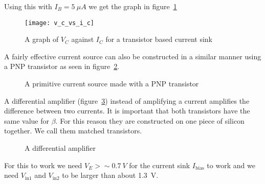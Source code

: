 \documentclass{article}
\begin{document}
    Using this with \(I_B = \SI{5}{\mu A}\) we get the graph in figure~\ref{fig:sink V_C-I_C}
    
    \begin{figure}[ht]
        \centering
        \texttt{[image: v\_c\_vs\_i\_c]}
        \caption{A graph of \(V_C\) against \(I_C\) for a transistor based current sink}
        \label{fig:sink V_C-I_C}
    \end{figure}
    
    A fairly effective current source can also be constructed in a similar manner using a PNP transistor as seen in figure~\ref{fig:primitive current source}.
    
    \begin{figure}[ht]
        \centering
        \caption{A primitive current source made with a PNP transistor}
        \label{fig:primitive current source}
    \end{figure}
    
    A differential amplifier (figure~\ref{fig:differential amplifier}) instead of amplifying a current amplifies the difference between two currents. It is important that both transistors have the same value for \(\beta\). For this reason they are constructed on one piece of silicon together. We call them matched transistors.
    
    \begin{figure}[ht]
        \centering
        \caption{A differential amplifier}
        \label{fig:differential amplifier}
    \end{figure}
    For this to work we need \(V_E>\sim \SI{0.7}{V}\) for the current sink \(I_\text{bias}\) to work and we need \(V_\text{in1}\) and \(V_\text{in2}\) to be larger than about \SI{1.3}{V}.
    
\end{document}
